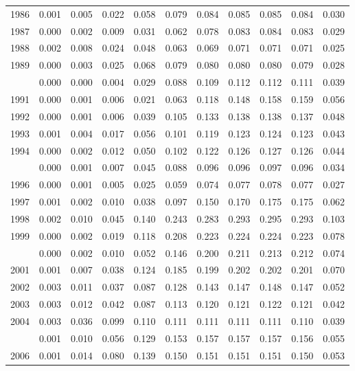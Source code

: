 \documentclass[
]{article}
\begin{document}
\begin{longtable}[t]{lrrrrrrrrrr}
1986 & 0.001 & 0.005 & 0.022 & 0.058 & 0.079 & 0.084 & 0.085 & 0.085 & 0.084 & 0.030\\
1987 & 0.000 & 0.002 & 0.009 & 0.031 & 0.062 & 0.078 & 0.083 & 0.084 & 0.083 & 0.029\\
1988 & 0.002 & 0.008 & 0.024 & 0.048 & 0.063 & 0.069 & 0.071 & 0.071 & 0.071 & 0.025\\
1989 & 0.000 & 0.003 & 0.025 & 0.068 & 0.079 & 0.080 & 0.080 & 0.080 & 0.079 & 0.028\\
\addlinespace
1990 & 0.000 & 0.000 & 0.004 & 0.029 & 0.088 & 0.109 & 0.112 & 0.112 & 0.111 & 0.039\\
1991 & 0.000 & 0.001 & 0.006 & 0.021 & 0.063 & 0.118 & 0.148 & 0.158 & 0.159 & 0.056\\
1992 & 0.000 & 0.001 & 0.006 & 0.039 & 0.105 & 0.133 & 0.138 & 0.138 & 0.137 & 0.048\\
1993 & 0.001 & 0.004 & 0.017 & 0.056 & 0.101 & 0.119 & 0.123 & 0.124 & 0.123 & 0.043\\
1994 & 0.000 & 0.002 & 0.012 & 0.050 & 0.102 & 0.122 & 0.126 & 0.127 & 0.126 & 0.044\\
\addlinespace
1995 & 0.000 & 0.001 & 0.007 & 0.045 & 0.088 & 0.096 & 0.096 & 0.097 & 0.096 & 0.034\\
1996 & 0.000 & 0.001 & 0.005 & 0.025 & 0.059 & 0.074 & 0.077 & 0.078 & 0.077 & 0.027\\
1997 & 0.001 & 0.002 & 0.010 & 0.038 & 0.097 & 0.150 & 0.170 & 0.175 & 0.175 & 0.062\\
1998 & 0.002 & 0.010 & 0.045 & 0.140 & 0.243 & 0.283 & 0.293 & 0.295 & 0.293 & 0.103\\
1999 & 0.000 & 0.002 & 0.019 & 0.118 & 0.208 & 0.223 & 0.224 & 0.224 & 0.223 & 0.078\\
\addlinespace
2000 & 0.000 & 0.002 & 0.010 & 0.052 & 0.146 & 0.200 & 0.211 & 0.213 & 0.212 & 0.074\\
2001 & 0.001 & 0.007 & 0.038 & 0.124 & 0.185 & 0.199 & 0.202 & 0.202 & 0.201 & 0.070\\
2002 & 0.003 & 0.011 & 0.037 & 0.087 & 0.128 & 0.143 & 0.147 & 0.148 & 0.147 & 0.052\\
2003 & 0.003 & 0.012 & 0.042 & 0.087 & 0.113 & 0.120 & 0.121 & 0.122 & 0.121 & 0.042\\
2004 & 0.003 & 0.036 & 0.099 & 0.110 & 0.111 & 0.111 & 0.111 & 0.111 & 0.110 & 0.039\\
\addlinespace
2005 & 0.001 & 0.010 & 0.056 & 0.129 & 0.153 & 0.157 & 0.157 & 0.157 & 0.156 & 0.055\\
2006 & 0.001 & 0.014 & 0.080 & 0.139 & 0.150 & 0.151 & 0.151 & 0.151 & 0.150 & 0.053\\

\end{longtable}
\end{document}
